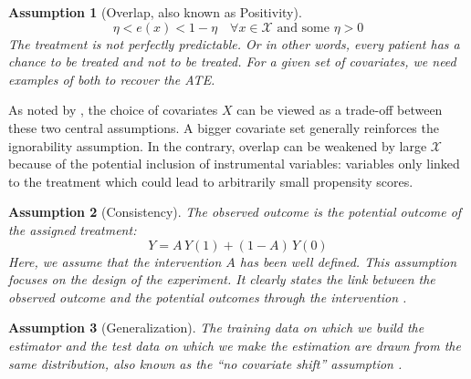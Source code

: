 \documentclass[10pt,letterpaper]{article}
\newtheorem{assumption}{Assumption}
\begin{document}
\begin{assumption}[Overlap, also known as Positivity]\label{assumption:overlap}
    \begin{equation}\label{eq:overlap}
        \eta < e(x) < 1 - \eta \quad \forall x \in \mathcal{X} \text{ and some }   \eta > 0
    \end{equation}
    The treatment is not perfectly predictable. Or in other words, every
    patient has a chance to be treated and not to be treated. For a given set of
    covariates, we need examples of both to recover the ATE.
\end{assumption}

As noted by \cite{damour2020overlap}, the choice of covariates $X$ can
be viewed as a trade-off between these two central assumptions. A bigger
covariate set generally reinforces the ignorability assumption. In the
contrary, overlap can be weakened by large $\mathcal{X}$ because of the
potential inclusion of instrumental variables: variables only linked to the treatment which
could lead to arbitrarily small propensity scores.



\begin{assumption}[Consistency]\label{assumption:consistency} The observed
    outcome is the potential outcome of the assigned treatment:
    \begin{equation}\label{eq:consistancy}
        Y = A \, Y(1) + (1-A) \, Y(0)
    \end{equation}
    Here, we assume that the intervention $A$ has been well defined. This
    assumption focuses on the design of the experiment. It clearly states the link
    between the observed outcome and the potential outcomes through the
    intervention \cite{hernan2020causal}.
\end{assumption}

\begin{assumption}[Generalization]\label{assumption:generalization} The training
    data on which we build the estimator and the test data on which we make the
    estimation are drawn from the same distribution, also known as
    the ``no covariate shift'' assumption \cite{jesson2020identifying}.
\end{assumption}



\end{document}
